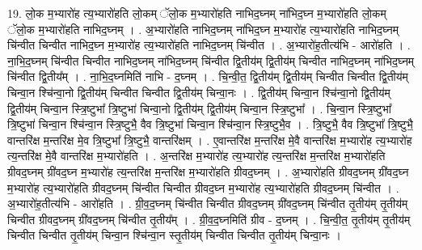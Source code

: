\documentclass[17pt]{extarticle}
\begin{document}
19. लो॒क म॒भ्यारो॑ह त्य॒भ्यारो॑हति लो॒कम् ॅलो॒क म॒भ्यारो॑हति नाभिद॒घ्नम् ना॑भिद॒घ्न म॒भ्यारो॑हति लो॒कम् ॅलो॒क म॒भ्यारो॑हति नाभिद॒घ्नम् । . अ॒भ्यारो॑हति नाभिद॒घ्नम् ना॑भिद॒घ्न म॒भ्यारो॑ह त्य॒भ्यारो॑हति नाभिद॒घ्नम् चि॑न्वीत चिन्वीत नाभिद॒घ्न म॒भ्यारो॑ह त्य॒भ्यारो॑हति नाभिद॒घ्नम् चि॑न्वीत । . अ॒भ्यारो॑ह॒तीत्य॑भि - आरो॑हति । . ना॒भि॒द॒घ्नम् चि॑न्वीत चिन्वीत नाभिद॒घ्नम् ना॑भिद॒घ्नम् चि॑न्वीत द्वि॒तीय॑म् द्वि॒तीय॑म् चिन्वीत नाभिद॒घ्नम् ना॑भिद॒घ्नम् चि॑न्वीत द्वि॒तीय᳚म् । . ना॒भि॒द॒घ्नमिति॑ नाभि - द॒घ्नम् । . चि॒न्वी॒त॒ द्वि॒तीय॑म् द्वि॒तीय॑म् चिन्वीत चिन्वीत द्वि॒तीय॑म् चिन्वा॒न श्चि॑न्वा॒नो द्वि॒तीय॑म् चिन्वीत चिन्वीत द्वि॒तीय॑म् चिन्वा॒नः । . द्वि॒तीय॑म् चिन्वा॒न श्चि॑न्वा॒नो द्वि॒तीय॑म् द्वि॒तीय॑म् चिन्वा॒न स्त्रि॒ष्टुभा᳚ त्रि॒ष्टुभा॑ चिन्वा॒नो द्वि॒तीय॑म् द्वि॒तीय॑म् चिन्वा॒न स्त्रि॒ष्टुभा᳚ । . चि॒न्वा॒न स्त्रि॒ष्टुभा᳚ त्रि॒ष्टुभा॑ चिन्वा॒न श्चि॑न्वा॒न स्त्रि॒ष्टुभै॒ वैव त्रि॒ष्टुभा॑ चिन्वा॒न श्चि॑न्वा॒न स्त्रि॒ष्टुभै॒व । . त्रि॒ष्टुभै॒ वैव त्रि॒ष्टुभा᳚ त्रि॒ष्टुभै॒ वान्तरि॑क्ष म॒न्तरि॑क्ष मे॒व त्रि॒ष्टुभा᳚ त्रि॒ष्टुभै॒ वान्तरि॑क्षम् । . ए॒वान्तरि॑क्ष म॒न्तरि॑क्ष मे॒वै वान्तरि॑क्ष म॒भ्यारो॑ह त्य॒भ्यारो॑ह त्य॒न्तरि॑क्ष मे॒वै वान्तरि॑क्ष म॒भ्यारो॑हति । . अ॒न्तरि॑क्ष म॒भ्यारो॑ह त्य॒भ्यारो॑ह त्य॒न्तरि॑क्ष म॒न्तरि॑क्ष म॒भ्यारो॑हति ग्रीवद॒घ्नम् ग्री॑वद॒घ्न म॒भ्यारो॑ह त्य॒न्तरि॑क्ष म॒न्तरि॑क्ष म॒भ्यारो॑हति ग्रीवद॒घ्नम् । . अ॒भ्यारो॑हति ग्रीवद॒घ्नम् ग्री॑वद॒घ्न म॒भ्यारो॑ह त्य॒भ्यारो॑हति ग्रीवद॒घ्नम् चि॑न्वीत चिन्वीत ग्रीवद॒घ्न म॒भ्यारो॑ह त्य॒भ्यारो॑हति ग्रीवद॒घ्नम् चि॑न्वीत । . अ॒भ्यारो॑ह॒तीत्य॑भि - आरो॑हति । . ग्री॒व॒द॒घ्नम् चि॑न्वीत चिन्वीत ग्रीवद॒घ्नम् ग्री॑वद॒घ्नम् चि॑न्वीत तृ॒तीय॑म् तृ॒तीय॑म् चिन्वीत ग्रीवद॒घ्नम् ग्री॑वद॒घ्नम् चि॑न्वीत तृ॒तीय᳚म् । . ग्री॒व॒द॒घ्नमिति॑ ग्रीव - द॒घ्नम् । . चि॒न्वी॒त॒ तृ॒तीय॑म् तृ॒तीय॑म् चिन्वीत चिन्वीत तृ॒तीय॑म् चिन्वा॒न श्चि॑न्वा॒न स्तृ॒तीय॑म् चिन्वीत चिन्वीत तृ॒तीय॑म् चिन्वा॒नः । \newline
\end{document}
